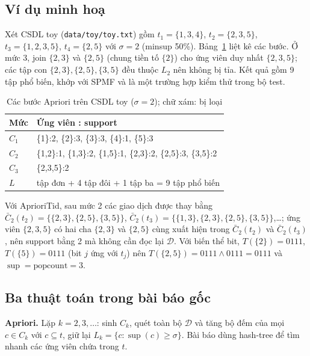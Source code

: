 \documentclass[10pt,twocolumn,letterpaper]{article}
\renewcommand{\sup}{\operatorname{sup}}
\newcommand{\D}{\mathcal{D}}
\begin{document}
\subsection{Ví dụ minh hoạ}
Xét CSDL toy (\texttt{data/toy/toy.txt}) gồm $t_1=\{1,3,4\}$, $t_2=\{2,3,5\}$, $t_3=\{1,2,3,5\}$, $t_4=\{2,5\}$ với $\sigma=2$ (minsup 50\%). Bảng~\ref{tab:toy} liệt kê các bước. Ở mức 3, join $\{2,3\}$ và $\{2,5\}$ (chung tiền tố $\{2\}$) cho ứng viên duy nhất $\{2,3,5\}$; các tập con $\{2,3\},\{2,5\},\{3,5\}$ đều thuộc $L_2$ nên không bị tỉa. Kết quả gồm 9 tập phổ biến, khớp với SPMF và là một trường hợp kiểm thử trong bộ test.

\begin{table}[t]
\centering
\caption{Các bước Apriori trên CSDL toy ($\sigma=2$); chữ xám: bị loại}
\label{tab:toy}
\footnotesize
\begin{tabular}{@{}l>{\raggedright\arraybackslash}p{6.2cm}@{}}
\toprule
Mức & Ứng viên : support \\ \midrule
$C_1$ & \{1\}:2, \{2\}:3, \{3\}:3, \textcolor{black!40}{\{4\}:1}, \{5\}:3 \\
$C_2$ & \textcolor{black!40}{\{1,2\}:1}, \{1,3\}:2, \textcolor{black!40}{\{1,5\}:1}, \{2,3\}:2, \{2,5\}:3, \{3,5\}:2 \\
$C_3$ & \{2,3,5\}:2 \\ \midrule
$L$ & 4 tập đơn + 4 tập đôi + 1 tập ba = 9 tập phổ biến \\
\bottomrule
\end{tabular}
\end{table}

Với AprioriTid, sau mức 2 các giao dịch được thay bằng $\bar{C}_2(t_2)=\{\{2,3\},\{2,5\},\{3,5\}\}$, $\bar{C}_2(t_3)=\{\{1,3\},\{2,3\},\{2,5\},\{3,5\}\}$,…; ứng viên $\{2,3,5\}$ có hai cha $\{2,3\}$ và $\{2,5\}$ cùng xuất hiện trong $\bar{C}_2(t_2)$ và $\bar{C}_2(t_3)$, nên support bằng 2 mà không cần đọc lại $\D$. Với biến thể bit, $T(\{2\})=0111$, $T(\{5\})=0111$ (bit $j$ ứng với $t_j$) nên $T(\{2,5\})=0111\wedge0111=0111$ và $\sup=\mathrm{popcount}=3$.

\subsection{Ba thuật toán trong bài báo gốc}
\textbf{Apriori.} Lặp $k=2,3,\dots$: sinh $C_k$, quét toàn bộ $\D$ và tăng bộ đếm của mọi $c\in C_k$ với $c\subseteq t$, giữ lại $L_k=\{c:\sup(c)\ge\sigma\}$. Bài báo dùng hash-tree để tìm nhanh các ứng viên chứa trong $t$.
\end{document}
